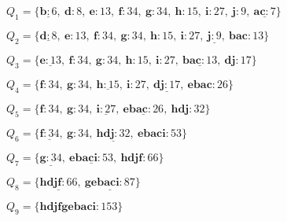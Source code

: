 $Q_1 = \{
	\underline{\mathbf{b}: 6}, \ 
	\mathbf{d}: 8, \ 
	\mathbf{e}: 13, \ 
	\mathbf{f}: 34, \ 
	\mathbf{g}: 34, \ 
	\mathbf{h}: 15, \ 
	\mathbf{i}: 27, \ 
	\mathbf{j}: 9, \
	\underline{\mathbf{ac}: 7} 
	\}
$

$Q_2 = \{
	\underline{\mathbf{d}: 8}, \ 
	\mathbf{e}: 13, \ 
	\mathbf{f}: 34, \ 
	\mathbf{g}: 34, \ 
	\mathbf{h}: 15, \ 
	\mathbf{i}: 27, \ 
	\underline{\mathbf{j}: 9}, \
	\mathbf{bac}: 13 
	\}
$

$Q_3 = \{
	\underline{\mathbf{e}: 13}, \ 
	\mathbf{f}: 34, \ 
	\mathbf{g}: 34, \ 
	\mathbf{h}: 15, \ 
	\mathbf{i}: 27, \ 
	\underline{\mathbf{bac}: 13}, \  
	\mathbf{dj}: 17
	\}
$

$Q_4 = \{
	\mathbf{f}: 34, \ 
	\mathbf{g}: 34, \ 
	\underline{\mathbf{h}: 15}, \ 
	\mathbf{i}: 27, \ 
	\underline{\mathbf{dj}: 17}, \ 
	\mathbf{ebac}: 26  
	\}
$

$Q_5 = \{
	\mathbf{f}: 34, \ 
	\mathbf{g}: 34, \ 
	\underline{\mathbf{i}: 27}, \ 
	\underline{\mathbf{ebac}: 26}, \   
	\mathbf{hdj}: 32
	\}
$

$Q_6 = \{
	\underline{\mathbf{f}: 34}, \ 
	\mathbf{g}: 34, \ 
	\underline{\mathbf{hdj}: 32}, \ 
	\mathbf{ebaci}: 53   
	\}
$

$Q_7 = \{
	\underline{\mathbf{g}: 34}, \ 
	\underline{\mathbf{ebaci}: 53}, \   
	\mathbf{hdjf}: 66
	\}
$

$Q_8 = \{
	\underline{\mathbf{hdjf}: 66}, \ 
	\underline{\mathbf{gebaci}: 87}   
	\}
$

$Q_9 = \{
	\mathbf{hdjfgebaci}: 153   
	\}
$

\

